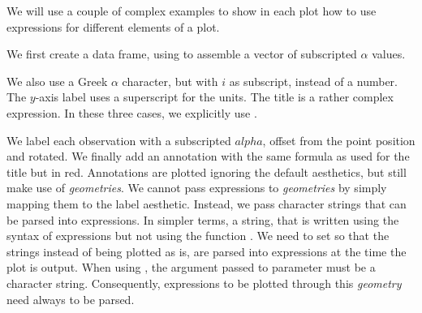 \documentclass[krantz2]{krantz}\usepackage{knitr}%
\begin{document}
\begin{knitrout}\footnotesize
{}\color{fgcolor}\begin{kframe}
\begin{alltt}
\end{alltt}
\end{kframe}
\end{knitrout}

We will use a couple of complex examples to show in each plot how to use expressions for different elements of a plot.

We first create a data frame, using  to assemble a vector of subscripted $\alpha$ values.
\begin{knitrout}\footnotesize
{}\color{fgcolor}\begin{kframe}
\begin{alltt}
\hlstd{(}\hlstd{)} 
 \hlkwb{<-}
  \hlstd{(} \hlstd{=} \hlopt{:}\hlstd{,}
              \hlstd{=} \hlstd{(}\hlstd{),}
              \hlstd{=} \hlstd{(}\hlstr{"alpha["}\hlstd{,} \hlopt{:}\hlstd{,} \hlstr{"]"}\hlstd{,}  \hlstd{=} \hlstd{))}
\end{alltt}
\end{kframe}
\end{knitrout}

We also use a Greek $\alpha$ character, but with $i$ as subscript, instead of a number. The $y$-axis label uses a superscript for the units. The title is a rather complex expression. In these three cases, we explicitly use .

We label each observation with a subscripted $alpha$, offset from the point position and rotated. We finally add an annotation with the same formula as used for the title but in red. Annotations are plotted ignoring the default aesthetics, but still make use of \emph{geometries}. We cannot pass expressions to \emph{geometries} by simply mapping them to the label aesthetic. Instead, we pass character strings that can be parsed into expressions. In simpler terms, a string, that is written using the syntax of expressions but not using the function . We need to set  so that the strings instead of being plotted as is, are parsed into expressions at the time the plot is output. When using , the argument passed to parameter  must be a character string. Consequently, expressions to be plotted through this \emph{geometry} need always to be parsed.
\end{document}
